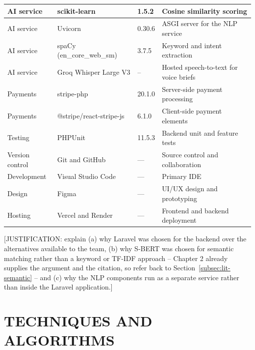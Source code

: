 \begin{table}[H]
\begin{tabularx}{\textwidth}{|l|l|l|X|}
    \hline
    AI service & scikit-learn & 1.5.2 & Cosine similarity scoring \\
    \hline
    AI service & Uvicorn & 0.30.6 & ASGI server for the NLP service \\
    \hline
    AI service & spaCy (en\_core\_web\_sm) & 3.7.5 & Keyword and intent extraction \\
    \hline
    AI service & Groq Whisper Large V3 & -- & Hosted speech-to-text for voice briefs \\
    \hline
    Payments & stripe-php & 20.1.0 & Server-side payment processing \\
    \hline
    Payments & @stripe/react-stripe-js & 6.1.0 & Client-side payment elements \\
    \hline
    Testing & PHPUnit & 11.5.3 & Backend unit and feature tests \\
    \hline
    Version control & Git and GitHub & --- & Source control and collaboration \\
    \hline
    Development & Visual Studio Code & --- & Primary IDE \\
    \hline
    Design & Figma & --- & UI/UX design and prototyping \\
    \hline
    Hosting & Vercel and Render & --- & Frontend and backend deployment \\
    \hline
  \end{tabularx}
\end{table}

%

[JUSTIFICATION: explain (a) why Laravel was chosen for the backend over
the alternatives available to the team, (b) why S-BERT was chosen for
semantic matching rather than a keyword or TF-IDF approach -- Chapter 2
already supplies the argument and the citation, so refer back to
Section~\ref{subsec:lit-semantic} -- and (c) why the NLP components run
as a separate service rather than inside the Laravel application.]

\section{TECHNIQUES AND ALGORITHMS}
\label{sec:techniques}

